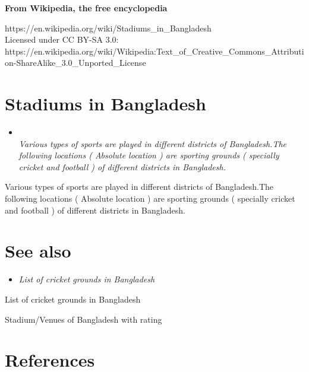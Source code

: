 \textbf{From Wikipedia, the free encyclopedia}

https://en.wikipedia.org/wiki/Stadiums\_in\_Bangladesh\\
Licensed under CC BY-SA 3.0:\\
https://en.wikipedia.org/wiki/Wikipedia:Text\_of\_Creative\_Commons\_Attribution-ShareAlike\_3.0\_Unported\_License

\section{Stadiums in Bangladesh}\label{stadiums-in-bangladesh}

\begin{itemize}
\item
  \emph{\\[2\baselineskip]Various types of sports are played in
  different districts of Bangladesh.The following locations ( Absolute
  location ) are sporting grounds ( specially cricket and football ) of
  different districts in Bangladesh.}
\end{itemize}

Various types of sports are played in different districts of
Bangladesh.The following locations ( Absolute location ) are sporting
grounds ( specially cricket and football ) of different districts in
Bangladesh.

\section{See also}\label{see-also}

\begin{itemize}
\item
  \emph{List of cricket grounds in Bangladesh}
\end{itemize}

List of cricket grounds in Bangladesh

Stadium/Venues of Bangladesh with rating

\section{References}\label{references}
